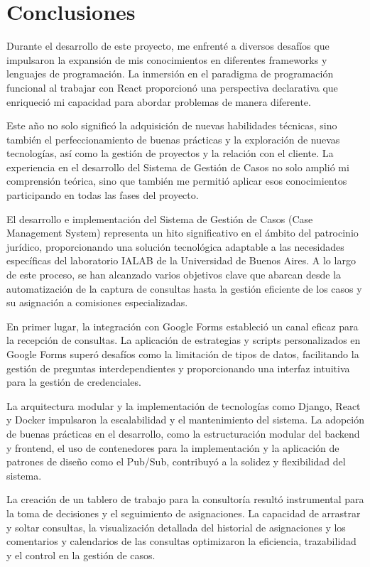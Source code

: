 \chapter{Conclusiones}\label{cap:conclusiones}

Durante el desarrollo de este proyecto, me enfrenté a diversos desafíos que impulsaron la expansión de mis conocimientos en diferentes frameworks y lenguajes de programación. La inmersión en el paradigma de programación funcional al trabajar con React proporcionó una perspectiva declarativa que enriqueció mi capacidad para abordar problemas de manera diferente.

Este año no solo significó la adquisición de nuevas habilidades técnicas, sino también el perfeccionamiento de buenas prácticas y la exploración de nuevas tecnologías, así como la gestión de proyectos y la relación con el cliente. La experiencia en el desarrollo del Sistema de Gestión de Casos no solo amplió mi comprensión teórica, sino que también me permitió aplicar esos conocimientos participando en todas las fases del proyecto.

El desarrollo e implementación del Sistema de Gestión de Casos (Case Management System) representa un hito significativo en el ámbito del patrocinio jurídico, proporcionando una solución tecnológica adaptable a las necesidades específicas del laboratorio IALAB de la Universidad de Buenos Aires. A lo largo de este proceso, se han alcanzado varios objetivos clave que abarcan desde la automatización de la captura de consultas hasta la gestión eficiente de los casos y su asignación a comisiones especializadas.

En primer lugar, la integración con Google Forms estableció un canal eficaz para la recepción de consultas. La aplicación de estrategias y scripts personalizados en Google Forms superó desafíos como la limitación de tipos de datos, facilitando la gestión de preguntas interdependientes y proporcionando una interfaz intuitiva para la gestión de credenciales.

La arquitectura modular y la implementación de tecnologías como Django, React y Docker impulsaron la escalabilidad y el mantenimiento del sistema. La adopción de buenas prácticas en el desarrollo, como la estructuración modular del backend y frontend, el uso de contenedores para la implementación y la aplicación de patrones de diseño como el Pub/Sub, contribuyó a la solidez y flexibilidad del sistema.

La creación de un tablero de trabajo para la consultoría resultó instrumental para la toma de decisiones y el seguimiento de asignaciones. La capacidad de arrastrar y soltar consultas, la visualización detallada del historial de asignaciones y los comentarios y calendarios de las consultas optimizaron la eficiencia, trazabilidad y el control en la gestión de casos.

